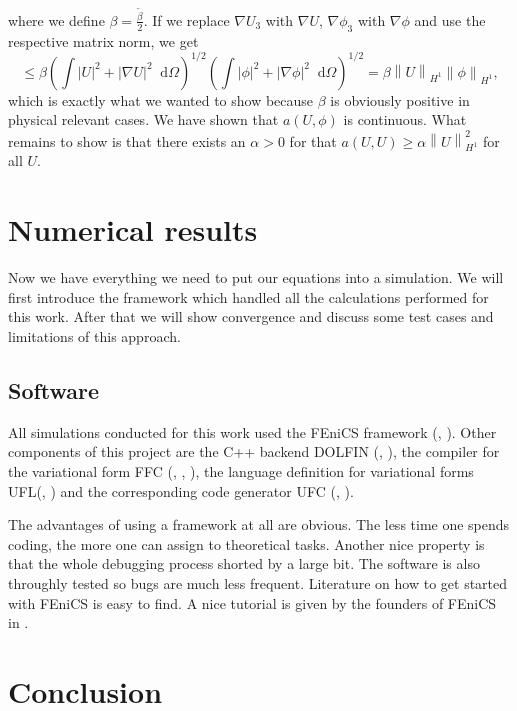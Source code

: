 \documentclass[12pt,a4paper,twoside, open=right]{scrreprt}
\theoremstyle{definition}
\theoremstyle{plain}
\newcommand{\abs}[1]{\left\vert #1\right\vert}
\newcommand{\norm}[1]{\left\lVert#1\right\rVert}
\newcommand{\D}{\mathop{}\!\mathrm{d}}
\begin{document}
where we define $\beta=\frac{\tilde\beta}{2}$. If we replace $\nabla U_3$ with $\nabla U$, $\nabla\phi_3$ with $\nabla\phi$ and use the respective matrix norm, we get
\begin{equation}
    \le\beta\left(\int\abs{U}^2+\abs{\nabla U}^2\D\Omega \right)^{1/2}\left(\int\abs{\phi}^2+\abs{\nabla\phi}^2\D\Omega\right)^{1/2}=\beta\norm{U}_{H^1}\norm{\phi}_{H^1},
\end{equation}
which is exactly what we wanted to show because $\beta$ is obviously positive in physical relevant cases. We have shown that $a(U,\phi)$ is continuous. What remains to show is that there exists an $\alpha>0$ for that $a(U,U)\ge \alpha\norm{U}_{H^1}^2$ for all $U$.
\chapter{Numerical results}
Now we have everything we need to put our equations into a simulation. We will first introduce the framework which handled all the calculations performed for this work. After that we will show convergence and discuss some test cases and limitations of this approach.
\section{Software}
All simulations conducted for this work used the FEniCS framework (\cite{AlnaesBlechta2015a}, \cite{LoggMardalEtAl2012a}). Other components of this project are the C++ backend DOLFIN (\cite{LoggWells2010a}, \cite{LoggWellsEtAl2012a}), the compiler for the variational form FFC (\cite{KirbyLogg2006a}, \cite{LoggOlgaardEtAl2012a}, \cite{OlgaardWells2010b}), the language definition for variational forms UFL(\cite{AlnaesEtAl2012}, \cite{Alnaes2012a}) and the corresponding code generator UFC (\cite{AlnaesLoggEtAl2009a}, \cite{AlnaesLoggEtAl2012a}).
\par 
The advantages of using a framework at all are obvious. The less time one spends coding, the more one can assign to theoretical tasks. Another nice property is that the whole debugging process shorted by a large bit. The software is also throughly tested so bugs are much less frequent. Literature on how to get started with FEniCS is easy to find. A nice tutorial is given by the founders of FEniCS in  \cite{Langtangen2017a}. 
\chapter{Conclusion}
\end{document}
